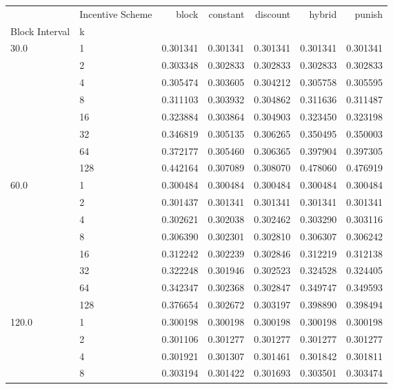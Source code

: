 \begin{tabular}{llrrrrr}
\toprule
      & Incentive Scheme &     block &  constant &  discount &    hybrid &    punish \\
Block Interval & k &           &           &           &           &           \\
\midrule
30.0  & 1   &  0.301341 &  0.301341 &  0.301341 &  0.301341 &  0.301341 \\
      & 2   &  0.303348 &  0.302833 &  0.302833 &  0.302833 &  0.302833 \\
      & 4   &  0.305474 &  0.303605 &  0.304212 &  0.305758 &  0.305595 \\
      & 8   &  0.311103 &  0.303932 &  0.304862 &  0.311636 &  0.311487 \\
      & 16  &  0.323884 &  0.303864 &  0.304903 &  0.323450 &  0.323198 \\
      & 32  &  0.346819 &  0.305135 &  0.306265 &  0.350495 &  0.350003 \\
      & 64  &  0.372177 &  0.305460 &  0.306365 &  0.397904 &  0.397305 \\
      & 128 &  0.442164 &  0.307089 &  0.308070 &  0.478060 &  0.476919 \\
60.0  & 1   &  0.300484 &  0.300484 &  0.300484 &  0.300484 &  0.300484 \\
      & 2   &  0.301437 &  0.301341 &  0.301341 &  0.301341 &  0.301341 \\
      & 4   &  0.302621 &  0.302038 &  0.302462 &  0.303290 &  0.303116 \\
      & 8   &  0.306390 &  0.302301 &  0.302810 &  0.306307 &  0.306242 \\
      & 16  &  0.312242 &  0.302239 &  0.302846 &  0.312219 &  0.312138 \\
      & 32  &  0.322248 &  0.301946 &  0.302523 &  0.324528 &  0.324405 \\
      & 64  &  0.342347 &  0.302368 &  0.302847 &  0.349747 &  0.349593 \\
      & 128 &  0.376654 &  0.302672 &  0.303197 &  0.398890 &  0.398494 \\
120.0 & 1   &  0.300198 &  0.300198 &  0.300198 &  0.300198 &  0.300198 \\
      & 2   &  0.301106 &  0.301277 &  0.301277 &  0.301277 &  0.301277 \\
      & 4   &  0.301921 &  0.301307 &  0.301461 &  0.301842 &  0.301811 \\
      & 8   &  0.303194 &  0.301422 &  0.301693 &  0.303501 &  0.303474 \\

\end{tabular}
